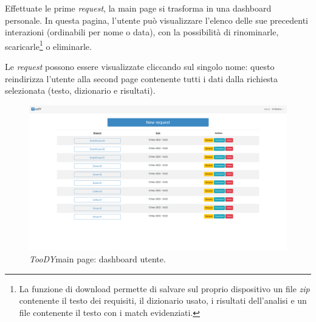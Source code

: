 \documentclass[12pt]{report}
\newcommand{\toody}{\textsl{TooDY}\xspace}
\begin{document}
Effettuate le prime \textit{request}, la \textsf{main page} si trasforma in una dashboard personale. In questa pagina, l'utente può visualizzare l'elenco delle sue precedenti interazioni (ordinabili per nome o data), con la possibilità di rinominarle, scaricarle\footnote{La funzione di download permette di salvare sul proprio dispositivo un file \textit{zip} contenente il testo dei requisiti, il dizionario usato, i risultati dell'analisi e un file contenente il testo con i match evidenziati.} o eliminarle.

Le \textit{request} possono essere visualizzate cliccando sul singolo nome: questo reindirizza l'utente alla \textsf{second page} contenente tutti i dati dalla richiesta selezionata (testo, dizionario e risultati).

\begin{figure}[H]
\centering
\includegraphics[width=1.0\textwidth]{pagina1-lista.png}
\caption{\toody \textsf{main page}: dashboard utente.}
\label{fig:pagina1-login}
\end{figure}
\end{document}
